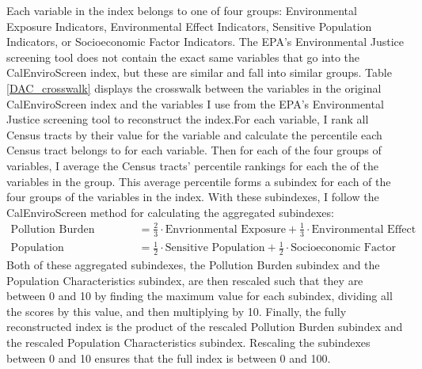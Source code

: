 Each variable in the index belongs to one of four groups: Environmental Exposure Indicators, Environmental Effect Indicators, Sensitive Population Indicators, or Socioeconomic Factor Indicators. The EPA's Environmental Justice screening tool does not contain the exact same variables that go into the CalEnviroScreen index, but these are similar and fall into similar groups. Table \ref{DAC_crosswalk} displays the crosswalk between the variables in the original CalEnviroScreen index and the variables I use from the EPA's Environmental Justice screening tool to reconstruct the index.For each variable, I rank all Census tracts by their value for the variable and calculate the percentile each Census tract belongs to for each variable. Then for each of the four groups of variables, I average the Census tracts' percentile rankings for each the of the variables in the group. This average percentile forms a subindex for each of the four groups of the variables in the index. With these subindexes, I follow the CalEnviroScreen method for calculating the aggregated subindexes:
\begin{align*}
    \text{Pollution Burden} &= \tfrac23 \cdot \text{Envrionmental Exposure} + \tfrac13 \cdot \text{Environmental Effect}\\
    \text{Population Characteristics} &= \tfrac12 \cdot \text{Sensitive Population} + \tfrac12 \cdot \text{Socioeconomic Factor}
\end{align*}
Both of these aggregated subindexes, the Pollution Burden subindex and the Population Characteristics subindex, are then rescaled such that they are between 0 and 10 by finding the maximum value for each subindex, dividing all the scores by this value, and then multiplying by 10. Finally, the fully reconstructed index is the product of the rescaled Pollution Burden subindex and the rescaled Population Characteristics subindex. Rescaling the subindexes between 0 and 10 ensures that the full index is between 0 and 100. 

